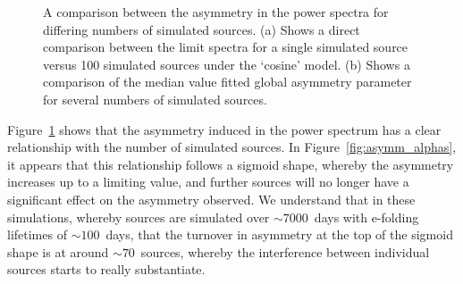 \begin{figure}[ht!]
	\centering
	\qquad
	\caption{A comparison between the asymmetry in the power spectra for differing numbers of simulated sources. (a) Shows a direct comparison between the limit spectra for a single simulated source versus 100 simulated sources under the `cosine' model. (b) Shows a comparison of the median value fitted global asymmetry parameter for several numbers of simulated sources.} 
	\label{fig:asymm_sources}
\end{figure}

Figure~\ref{fig:asymm_sources} shows that the asymmetry induced in the power spectrum has a clear relationship with the number of simulated sources. In Figure~\ref{fig:asymm_alphas}, it appears that this relationship follows a sigmoid shape, whereby the asymmetry increases up to a limiting value, and further sources will no longer have a significant effect on the asymmetry observed. We understand that in these simulations, whereby sources are simulated over $\sim 7000$~days with e-folding lifetimes of $\sim 100$~days, that the turnover in asymmetry at the top of the sigmoid shape is at around $\sim 70$~sources, whereby the interference between individual sources starts to really substantiate.

